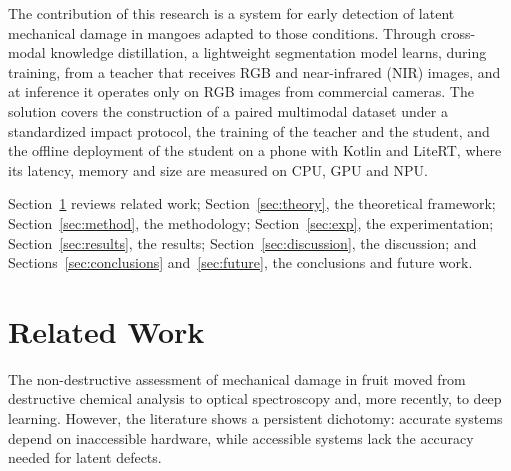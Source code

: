 \documentclass[journal]{IEEEtran}
\begin{document}
The contribution of this research is a system for early detection of latent mechanical damage in mangoes adapted to those conditions. Through cross-modal knowledge distillation, a lightweight segmentation model learns, during training, from a teacher that receives RGB and near-infrared (NIR) images, and at inference it operates only on RGB images from commercial cameras. The solution covers the construction of a paired multimodal dataset under a standardized impact protocol, the training of the teacher and the student, and the offline deployment of the student on a phone with Kotlin and LiteRT, where its latency, memory and size are measured on CPU, GPU and NPU.

Section~\ref{sec:related} reviews related work; Section~\ref{sec:theory}, the theoretical framework; Section~\ref{sec:method}, the methodology; Section~\ref{sec:exp}, the experimentation; Section~\ref{sec:results}, the results; Section~\ref{sec:discussion}, the discussion; and Sections~\ref{sec:conclusions} and~\ref{sec:future}, the conclusions and future work.

\section{Related Work}\label{sec:related}
The non-destructive assessment of mechanical damage in fruit moved from destructive chemical analysis to optical spectroscopy and, more recently, to deep learning. However, the literature shows a persistent dichotomy: accurate systems depend on inaccessible hardware, while accessible systems lack the accuracy needed for latent defects.
\end{document}
